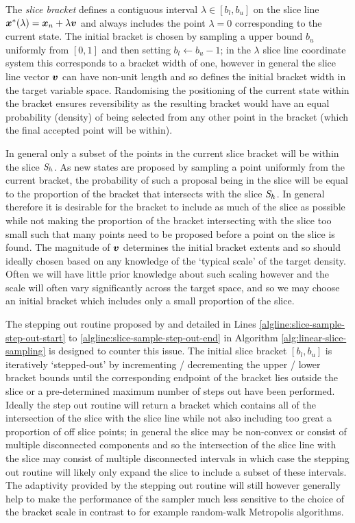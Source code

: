 The \emph{slice bracket} defines a contiguous interval $\lambda \in [b_l,b_u]$ on the slice line $\boldsymbol{x}^*(\lambda) = \boldsymbol{x}_n + \lambda \boldsymbol{v}$ and always includes the point $\lambda = 0$ corresponding to the current state. The initial bracket is chosen by sampling a upper bound $b_u$ uniformly from $[0, 1]$ and then setting $b_l \gets b_u - 1$; in the $\lambda$ slice line coordinate system this corresponds to a bracket width of one, however in general the slice line vector $\boldsymbol{v}$ can have non-unit length and so defines the initial bracket width in the target variable space. Randomising the positioning of the current state within the bracket ensures reversibility as the resulting bracket would have an equal probability (density) of being selected from any other point in the bracket (which the final accepted point will be within).

In general only a subset of the points in the current slice bracket will be within the slice $\mathit{S}_h$. As new states are proposed by sampling a point uniformly from the current bracket, the probability of such a proposal being in the slice will be equal to the proportion of the bracket that intersects with the slice $\mathit{S}_h$. In general therefore it is desirable for the bracket to include as much of the slice as possible while not making the proportion of the bracket intersecting with the slice too small such that many points need to be proposed before a point on the slice is found. The magnitude of $\boldsymbol{v}$ determines the initial bracket extents and so should ideally chosen based on any knowledge of the `typical scale' of the target density. Often we will have little prior knowledge about such scaling however and the scale will often vary significantly across the target space, and so we may choose an initial bracket which includes only a small proportion of the slice.

The stepping out routine proposed by \citep{neal2003slice} and detailed in Lines \ref{algline:slice-sample-step-out-start} to \ref{algline:slice-sample-step-out-end} in Algorithm \ref{alg:linear-slice-sampling} is designed to counter this issue. The initial slice bracket $[b_l, b_u]$ is iteratively `stepped-out' by incrementing / decrementing the upper / lower bracket bounds until the corresponding endpoint of the bracket lies outside the slice or a pre-determined maximum number of steps out have been performed. Ideally the step out routine will return a bracket which contains all of the intersection of the slice with the slice line while not also including too great a proportion of off slice points; in general the slice may be non-convex or consist of multiple disconnected components and so the intersection of the slice line with the slice may consist of multiple disconnected intervals in which case the stepping out routine will likely only expand the slice to include a subset of these intervals. The adaptivity provided by the stepping out routine will still however generally help to make the performance of the sampler much less sensitive to the choice of the bracket scale in contrast to for example random-walk Metropolis algorithms. %

